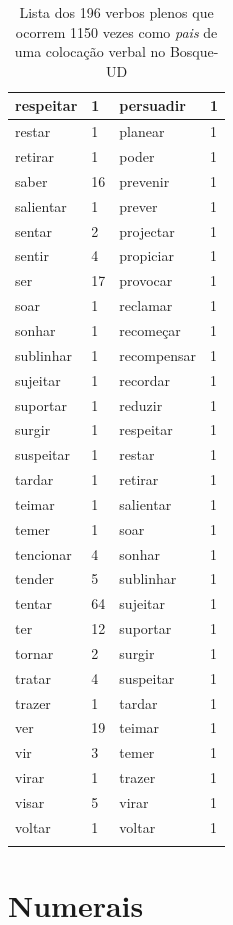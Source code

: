 \documentclass[output=paper,colorlinks,citecolor=brown]{langscibook}
\begin{document}
\begin{longtable}{ p{3cm} | p{1cm} | p{3cm} | p{1cm} }
			respeitar & 1 & persuadir & 1\\\hline
			restar & 1 & planear & 1\\\hline
			retirar & 1 & poder & 1\\\hline
			saber & 16 & prevenir & 1\\\hline
			salientar & 1 & prever & 1\\\hline
			sentar & 2 & projectar & 1\\\hline
			sentir & 4 & propiciar & 1\\\hline
			ser & 17 & provocar & 1\\\hline
			soar & 1 & reclamar & 1\\\hline
			sonhar & 1 & recomeçar & 1\\\hline
			sublinhar & 1 & recompensar & 1\\\hline
			sujeitar & 1 & recordar & 1\\\hline
			suportar & 1 & reduzir & 1\\\hline
			surgir & 1 & respeitar & 1\\\hline
			suspeitar & 1 & restar & 1\\\hline
			tardar & 1 & retirar & 1\\\hline
			teimar & 1 & salientar & 1\\\hline
			temer & 1 & soar & 1\\\hline
			tencionar & 4 & sonhar & 1\\\hline
			tender & 5 & sublinhar & 1\\\hline
			tentar & 64 & sujeitar & 1\\\hline
			ter & 12 & suportar & 1\\\hline
			tornar & 2 & surgir & 1\\\hline
			tratar & 4 & suspeitar & 1\\\hline
			trazer & 1 & tardar & 1\\\hline
			ver & 19 & teimar & 1\\\hline
			vir & 3 & temer & 1\\\hline
			virar & 1 & trazer & 1\\\hline
			visar & 5 & virar & 1\\\hline
			voltar & 1 & voltar & 1\\\hline
			\caption{Lista dos 196 verbos plenos que ocorrem 1150 vezes como \emph{pais} de uma colocação verbal no Bosque-UD}
			\label{tab:naolocverbal}
		\end{longtable}


\section{Numerais}\label{sec:numerais}
\end{document}
